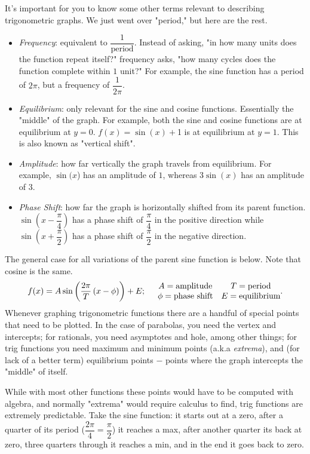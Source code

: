 \documentclass[lang=en,11pt]{elegantbook}
\begin{document}
It’s important for you to know some other terms relevant to describing trigonometric graphs. We just went over "period," but here are the rest.\begin{itemize}
    \item \textit{Frequency}: equivalent to $\dfrac{1}{\text{period}}$. Instead of asking, "in how many units does the function repeat itself?" frequency asks, "how many cycles does the function complete within $1$ unit?" For example, the sine function has a period of $2\pi$, but a frequency of $\dfrac{1}{2\pi}$.
    \item \textit{Equilibrium}: only relevant for the sine and cosine functions. Essentially the "middle" of the graph. For example, both the sine and cosine functions are at equilibrium at $y=0$. $f(x)=\sin⁡(x)+$1 is at equilibrium at $y=1$. This is also known as "vertical shift".
    \item \textit{Amplitude}: how far vertically the graph travels from equilibrium. For example, $\sin⁡(x$) has an amplitude of $1$, whereas $3\sin⁡(x)$ has an amplitude of $3$.
    \item \textit{Phase Shift}: how far the graph is horizontally shifted from its parent function.  $\sin\left(x-\dfrac{\pi}{4}\right)$ has a phase shift of $\dfrac{\pi}{4}$ in the positive direction while $\sin\left(x+\dfrac{\pi}{2}\right)$ has a phase shift of $\dfrac{\pi}{2}$ in the negative direction.
\end{itemize}
The general case for all variations of the parent sine function is below.  Note that cosine is the same. $$f(x)=A\sin\left(\dfrac{2\pi}{T}\left(x-\phi\right)\right)+E; \hspace{5mm} \begin{matrix} A=\text{amplitude} & T=\text{period} \\ \phi=\text{phase shift} & E=\text{equilibrium}\end{matrix}.$$
Whenever graphing trigonometric functions there are a handful of special points that need to be plotted. In the case of parabolas, you need the vertex and intercepts; for rationals, you need asymptotes and hole, among other things; for trig functions you need maximum and minimum points (a.k.a \textit{extrema}), and (for lack of a better term) equilibrium points $-$ points where the graph intercepts the "middle" of itself.

While with most other functions these points would have to be computed with algebra, and normally "extrema" would require calculus to find, trig functions are extremely predictable. Take the sine function: it starts out at a zero, after a quarter of its period ($\dfrac{2\pi}{4}=\dfrac{\pi}{2}$) it reaches a max, after another quarter its back at zero, three quarters through it reaches a min, and in the end it goes back to zero.
\end{document}
